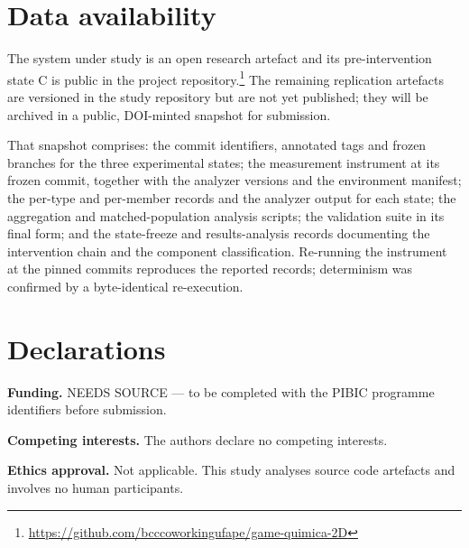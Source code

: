 \documentclass{sbc2019}%
\begin{document}
\section*{Data availability}

The system under study is an open research artefact and its pre-intervention
state C is public in the project
repository.\footnote{\url{https://github.com/bcccoworkingufape/game-quimica-2D}}
The remaining replication artefacts are versioned in the study repository but
are not yet published; they will be archived in a public, DOI-minted snapshot
for submission.

That snapshot comprises: the commit identifiers, annotated tags and frozen
branches for the three experimental states; the measurement instrument at its frozen commit,
together with the analyzer versions and the environment manifest; the per-type
and per-member records and the analyzer output for each state; the aggregation
and matched-population analysis scripts; the validation suite in its final form;
and the state-freeze and results-analysis records documenting the intervention
chain and the component classification. Re-running the instrument at the pinned
commits reproduces the reported records; determinism was confirmed by a
byte-identical re-execution.

\section*{Declarations}

\noindent\textbf{Funding.} NEEDS SOURCE --- to be completed with the PIBIC
programme identifiers before submission.

\noindent\textbf{Competing interests.} The authors declare no competing
interests.

\noindent\textbf{Ethics approval.} Not applicable. This study analyses source
code artefacts and involves no human participants.



\end{document}
